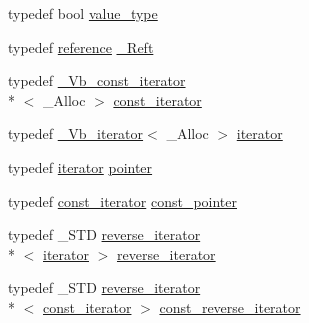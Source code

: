 \begin{DoxyCompactItemize}
\item 
typedef bool \hyperlink{classvector_3_01___bool_00_01___alloc_01_4_ab9c7e051ec6defeeeb22fa53d3cfca8c}{value\+\_\+type}
\item 
typedef \hyperlink{classvector_3_01___bool_00_01___alloc_01_4_afa1a38ae57c26454f265b34ebc302830}{reference} \hyperlink{classvector_3_01___bool_00_01___alloc_01_4_a22d06114ab3f5ef9677e423f41d99846}{\+\_\+\+Reft}
\item 
typedef \hyperlink{class___vb__const__iterator}{\+\_\+\+Vb\+\_\+const\+\_\+iterator}\\*
$<$ \+\_\+\+Alloc $>$ \hyperlink{classvector_3_01___bool_00_01___alloc_01_4_a79966c86fbbd4dcb38b01eb352633b7e}{const\+\_\+iterator}
\item 
typedef \hyperlink{class___vb__iterator}{\+\_\+\+Vb\+\_\+iterator}$<$ \+\_\+\+Alloc $>$ \hyperlink{classvector_3_01___bool_00_01___alloc_01_4_a151edfa584da275286dbb10b3992940e}{iterator}
\item 
typedef \hyperlink{classvector_3_01___bool_00_01___alloc_01_4_a151edfa584da275286dbb10b3992940e}{iterator} \hyperlink{classvector_3_01___bool_00_01___alloc_01_4_a7694039a51b5a3b856f2c1438d6f5700}{pointer}
\item 
typedef \hyperlink{classvector_3_01___bool_00_01___alloc_01_4_a79966c86fbbd4dcb38b01eb352633b7e}{const\+\_\+iterator} \hyperlink{classvector_3_01___bool_00_01___alloc_01_4_a37c69754c68d037af4ff810352cfefe7}{const\+\_\+pointer}
\item 
typedef \+\_\+\+S\+T\+D \hyperlink{classvector_3_01___bool_00_01___alloc_01_4_a91f49dea5e022761921d459ecd97aef7}{reverse\+\_\+iterator}\\*
$<$ \hyperlink{classvector_3_01___bool_00_01___alloc_01_4_a151edfa584da275286dbb10b3992940e}{iterator} $>$ \hyperlink{classvector_3_01___bool_00_01___alloc_01_4_a91f49dea5e022761921d459ecd97aef7}{reverse\+\_\+iterator}
\item 
typedef \+\_\+\+S\+T\+D \hyperlink{classvector_3_01___bool_00_01___alloc_01_4_a91f49dea5e022761921d459ecd97aef7}{reverse\+\_\+iterator}\\*
$<$ \hyperlink{classvector_3_01___bool_00_01___alloc_01_4_a79966c86fbbd4dcb38b01eb352633b7e}{const\+\_\+iterator} $>$ \hyperlink{classvector_3_01___bool_00_01___alloc_01_4_a519201ff91b19c9cf5f448eee90401d8}{const\+\_\+reverse\+\_\+iterator}
\end{DoxyCompactItemize}
